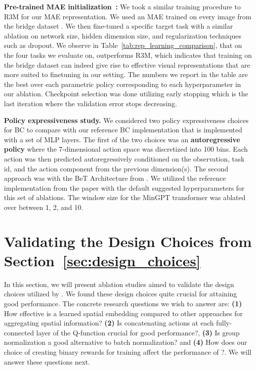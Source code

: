\documentclass[../thesis.tex]{subfiles}
\begin{document}
\textbf{Pre-trained MAE initialization~\citep{he2111masked}:}
We took a similar training procedure to R3M for our MAE representation. We used an MAE trained on every image from the bridge dataset \citet{ebert2021bridge}. We then fine-tuned a specific target task with a similar ablation on network size, hidden dimension size, and regularization techniques such as dropout.  We observe in Table~\ref{tab:rep_learning_comparison}, that on the four tasks we evaluate on, \ptrmethodname outperforms R3M, which indicates that training on the bridge dataset can indeed give rise to effective visual representations that are more suited to finetuning in our setting. The numbers we report in the table are the best over each parametric policy corresponding to each hyperparameter in our ablation. Checkpoint selection was done utilizing early stopping which is the last iteration where the validation error stops decreasing. 

\textbf{Policy expressiveness study.}
We considered two policy expressiveness choices for BC to compare with our reference BC implementation that is implemented with a set of MLP layers. The first of the two choices was an \textbf{autoregressive policy} where the 7-dimensional action space was discretized into 100 bins. Each action was then predicted autoregressively conditioned on the observation, task id, and the action component from the previous dimension(s). The second approach was with the BeT Architecture from \citet{shafiullah2022behavior}. We utilized the reference implementation from the paper with the default suggested hyperparameters for this set of ablations. The window size for the MinGPT transformer was ablated over between 1, 2, and 10.

\section{Validating the Design Choices from Section~\ref{sec:design_choices}}
\label{app:design}

In this section, we will present ablation studies aimed to validate the design choices utilized by \ptrmethodname. We found these design choices quite crucial for attaining good performance. The concrete research questions we wish to answer are: \textbf{(1)} How effective is a learned spatial embedding compared to other approaches for aggregating spatial information? \textbf{(2)} Is concatenating actions at each fully-connected layer of the Q-function crucial for good performance?, \textbf{(3)} Is group normalization a good alternative to batch normalization? and \textbf{(4)} How does our choice of creating binary rewards for training affect the performance of \ptrmethodname?. We will answer these questions next.
\end{document}
